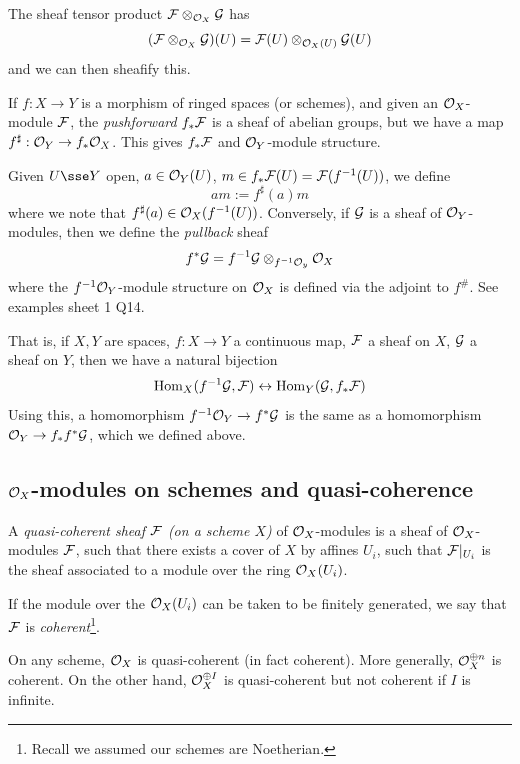 \documentclass{article}
\begin{document}
The sheaf tensor product \(\mathcal{F} \otimes_{\mathcal{O}_X}\mathcal{G}\) has
\[(\mathcal{F} \otimes_{\mathcal{O}_X} \mathcal{G})(U) = \mathcal{F}(U) \otimes_{\mathcal{O}_X(U)} \mathcal{G}(U)\]
and we can then sheafify this.

If \(f : X \to Y\) is a morphism of ringed spaces (or schemes), and given an \(\mathcal{O}_X\)-module \(\mathcal{F}\), the \emph{pushforward} \(f_*\mathcal{F}\) is a sheaf of abelian groups, but we have a map \(f^\sharp : \mathcal{O}_Y \to f_*\mathcal{O}_X\). This gives \(f_*\mathcal{F}\) and \(\mathcal{O}_Y\)-module structure.

Given \(U \sse Y\) open, \(a \in \mathcal{O}_Y(U)\), \(m \in f_*\mathcal{F}(U) = \mathcal{F}(f^{-1}(U))\), we define
\[am := f^\sharp(a)m\]
where we note that \(f^\sharp(a) \in \mathcal{O}_X(f^{-1}(U))\). Conversely, if \(\mathcal{G}\) is a sheaf of \(\mathcal{O}_Y\)-modules, then we define the \emph{pullback} sheaf
\[f^*\mathcal{G} = f^{-1}\mathcal{G} \otimes_{f^{-1}\mathcal{O}_y}\mathcal{O}_X\]
where the \(f^{-1}\mathcal{O}_Y\)-module structure on \(\mathcal{O}_X\) is defined via the adjoint to \(f^\#\). See examples sheet 1 Q14. \begin{addendum}
    That is, if \(X, Y\) are spaces, \(f : X \to Y\) a continuous map, \(\mathcal{F}\) a sheaf on \(X\), \(\mathcal{G}\) a sheaf on \(Y\), then we have a natural bijection
    \[\operatorname{Hom}_X(f^{-1}\mathcal{G}, \mathcal{F}) \leftrightarrow \operatorname{Hom}_Y(\mathcal{G}, f_*\mathcal{F})\]
    Using this, a homomorphism \(f^{-1}\mathcal{O}_Y \to f^*\mathcal{G}\) is the same as a homomorphism \(\mathcal{O}_Y \to f_*f^*\mathcal{G}\), which we defined above.
\end{addendum}

\subsection{\(\mathcal{O}_X\)-modules on schemes and quasi-coherence}

\begin{definition}
    A \emph{quasi-coherent sheaf \(\mathcal{F}\) (on a scheme \(X\))} of \(\mathcal{O}_X\)-modules is a sheaf of \(\mathcal{O}_X\)-modules \(\mathcal{F}\), such that there exists a cover of \(X\) by affines \(U_i\), such that \(\mathcal{F}\vert_{U_i}\) is the sheaf associated to a module over the ring \(\mathcal{O}_X(U_i)\).

    If the module over the \(\mathcal{O}_X(U_i)\) can be taken to be finitely generated, we say that \(\mathcal{F}\) is \emph{coherent}\footnote{Recall we assumed our schemes are Noetherian.}.
\end{definition}

\begin{example}
    On any scheme, \(\mathcal{O}_X\) is quasi-coherent (in fact coherent). More generally, \(\mathcal{O}_X^{\oplus n}\) is coherent. On the other hand, \(\mathcal{O}_X^{\oplus I}\) is quasi-coherent but not coherent if \(I\) is infinite.
\end{example}
\end{document}

